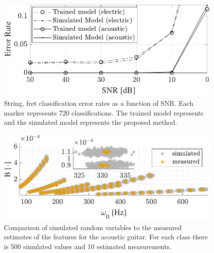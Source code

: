 \documentclass{article}
\begin{document}
\begin{sloppy}
%
\begin{figure}[t]
\centering
   \includegraphics[width=.86\linewidth]{img/SNRfig_both.pdf}\vspace{-2mm}
   \caption{String, fret classification error rates as a function of SNR. Each marker represents 720 classifications. The trained model represents~\cite{hjerrild::icassp19} and the simulated model represents the proposed method.}
   \label{fig:string_fret_sbr_Electric} 
\end{figure}
%
%
%
\begin{figure}[t]
\centering
   \includegraphics[width=.96\linewidth]{img/w0_vs_B.pdf}\vspace{-2mm}
   \caption{Comparison of simulated random variables to the measured estimates of the features for the acoustic guitar. For each class there is 500 simulated values and 10 estimated measurements.}
   \label{fig:string_fret_sbr_Electric} 
\end{figure}



\end{sloppy}
\end{document}
